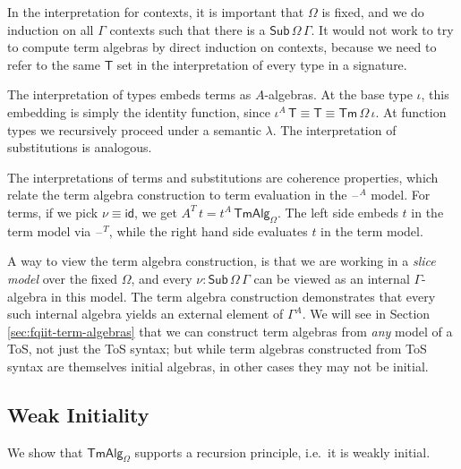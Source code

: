 \documentclass[12pt,a4paper,twoside,openany]{book}
\theoremstyle{remark}
\theoremstyle{definition}
\newcommand{\ms}[1]{\mathsf{#1}}
\newcommand{\id}{\mathsf{id}}
\newcommand{\Sub}{\mathsf{Sub}}
\newcommand{\Tm}{\mathsf{Tm}}
\newcommand{\blank}{\mathord{\hspace{1pt}\text{--}\hspace{1pt}}}
\newcommand{\TmAlg}{\ms{TmAlg}}
\begin{document}
In the interpretation for contexts, it is important that $\Omega$ is
fixed, and we do induction on all $\Gamma$ contexts such that there is a
$\Sub\,\Omega\,\Gamma$. It would not work to try to compute term algebras by
direct induction on contexts, because we need to refer to the same $\ms{T}$ set
in the interpretation of every type in a signature.

The interpretation of types embeds terms as $A$-algebras. At the base type
$\iota$, this embedding is simply the identity function, since $\iota^A\,\ms{T}
\equiv \ms{T} \equiv \Tm\,\Omega\,\iota$. At function types we recursively proceed
under a semantic $\lambda$. The interpretation of substitutions is analogous.

The interpretations of terms and substitutions are coherence properties, which
relate the term algebra construction to term evaluation in the $\blank^A$ model.
For terms, if we pick $\nu \equiv \id$, we get $A^T\,t =
t^A\,\TmAlg_{\Omega}$. The left side embeds $t$ in the term model via
$\blank^T$, while the right hand side evaluates $t$ in the term model.

A way to view the term algebra construction, is that we are working in a
\emph{slice model} over the fixed $\Omega$, and every $\nu :
\Sub\,\Omega\,\Gamma$ can be viewed as an internal $\Gamma$-algebra in this
model. The term algebra construction demonstrates that
every such internal algebra yields an external element of $\Gamma^A$. We will
see in Section \ref{sec:fqiit-term-algebras} that we can construct term algebras
from \emph{any} model of a ToS, not just the ToS syntax; but while term algebras
constructed from ToS syntax are themselves initial algebras, in other cases they
may not be initial.

\subsection{Weak Initiality}
We show that $\TmAlg_{\Omega}$ supports a recursion principle, i.e.\ it is weakly
initial.
\end{document}
